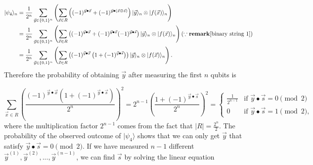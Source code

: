 $$
\begin{aligned}
|\psi_4\rangle_n 
& =\frac{1}{2^{n}} \sum_{\vec{y} \in \{0,1\}^n}\left(\sum_{\vec{x} \in R} \left((-1)^{\vec{y} \bullet \vec{x}} +(-1)^{\vec{y} \bullet(\vec{x} \oplus \vec{s})}\right)|\vec{y}\rangle_n \otimes |f(\vec{x})\rangle_n\right) \\
& = \frac{1}{2^n} \sum_{\vec{y} \in \{0,1\}^n} \left( \sum_{\vec{x} \in R} \left((-1)^{\vec{y} \bullet \vec{x}} + (-1)^{\vec{y} \bullet \vec{x}} (-1)^{\vec{y} \bullet \vec{s}}\right) |\vec{y}\rangle_n \otimes |f(\vec{x})\rangle_n \right)(\because \mathbf{remark} \ref{binary string 1})\\
& = \frac{1}{2^n} \sum_{\vec{y} \in \{0,1\}^n}\left(\sum_{\vec{x} \in R} \left((-1)^{\vec{y} \bullet \vec{x}}\left(1+(-1)^{\vec{y} \bullet \vec{s}}\right)\right)|\vec{y}\rangle_n \otimes|f(\vec{x})\rangle_n\right).
\end{aligned}
$$
Therefore the probability of obtaining $\vec{y}$ after measuring the first $n$ qubits is

$$
\sum_{\vec{x} \in R}\left(\frac{(-1)^{\vec{y} \bullet \vec{x}}\left(1+(-1)^{\vec{y} \bullet \vec{s}}\right)}{2^n}\right)^2=2^{n-1}\left(\frac{1+(-1)^{\vec{y} \bullet \vec{s}}}{2^n}\right)^2=
\begin{cases}
\frac{1}{2^{n-1}} & \text{if } \vec{y} \bullet \vec{s} = 0 \pmod{2} \\
0 & \text{if } \vec{y} \bullet \vec{s} = 1 \pmod{2},
\end{cases}
$$
where the multiplication factor $2^{n-1}$ comes from the fact that $|R|=\frac{2^n}{2}$. The probability of the observed outcome of $|\psi_4\rangle$ shows that we can only get $\vec{y}$ that satisfy $\vec{y} \bullet \vec{s} = 0 \pmod{2}$. If we have measured $n-1$ different $\vec{y}^{(1)}, \vec{y}^{(2)},..., \vec{y}^{(n-1)}$, we can find $\vec{s}$ by solving the linear equation 

